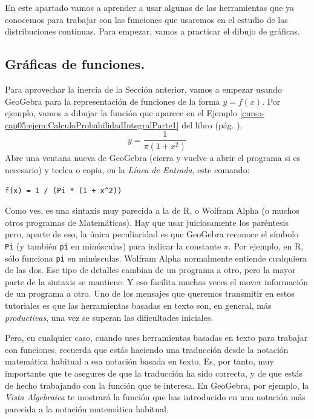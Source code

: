 \documentclass[10pt,a4paper]{article}\usepackage[]{graphicx}\usepackage[]{color}
\newcounter{cont01}
\begin{document}
En este apartado vamos a aprender a usar algunas de las herramientas que ya conocemos para trabajar con las funciones que usaremos en el estudio de las distribuciones continuas. Para empezar, vamos a practicar el dibujo de gráficas.

\subsection{Gráficas de funciones.}

Para aprovechar la inercia de la Sección anterior, vamos a empezar usando GeoGebra para la representación de funciones de la forma $y = f(x)$. Por ejemplo, vamos a dibujar la función que aparece en el Ejemplo \ref{curso-cap05:ejem:CalculoProbabilidadIntegralParte1} del libro (pág. \pageref{curso-cap05:ejem:CalculoProbabilidadIntegralParte1}).
\[
y = \dfrac{1}{\pi(1+x^2)}
\]
Abre una ventana nueva de GeoGebra (cierra y vuelve a abrir el programa si es necesario) y teclea o copia, en la {\em Línea de Entrada}, este comando:
\begin{center}
  \verb&f(x) = 1 / (Pi * (1 + x^2))&
\end{center}
Como ves, es una sintaxis muy parecida a la de R, o Wolfram Alpha (o muchos otros programas de Matemáticas). Hay que usar juiciosamente los paréntesis pero, aparte de eso, la única peculiaridad es que GeoGebra reconoce el símbolo {\tt Pi} (y también {\tt pi} en minúsculas) para indicar la constante $\pi$. Por ejemplo, en R, sólo funciona {\tt pi} en minúsculas. Wolfram Alpha normalmente entiende cualquiera de las dos. Ese tipo de detalles cambian de un programa a otro, pero la mayor parte de la sintaxis se mantiene. Y eso facilita muchas veces el mover información de un programa a otro. Uno de los mensajes que queremos transmitir en estos tutoriales es que las herramientas basadas en texto son, en general, más {\em productivas}, una vez se superan las dificultades iniciales.

Pero, en cualquier caso, cuando uses herramientas basadas en texto para trabajar con funciones, recuerda que estás haciendo una traducción desde la notación matemática habitual a esa notación basada en texto. Es, por tanto, muy importante que te asegures de que la traducción ha sido correcta, y de que estás de hecho trabajando con la función que te interesa. En GeoGebra, por ejemplo, la {\em Vista Algebraica} te mostrará la función que has introducido en una notación más parecida a la notación matemática habitual.
\end{document}
